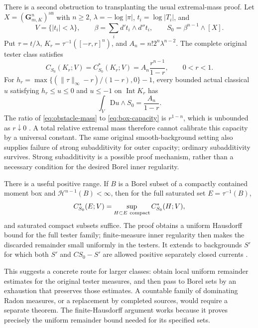 \documentclass[11pt,a4paper]{article}
\newcommand{\MathEqref}[1]{{\hypersetup{linkcolor=EquationLink}\eqref{#1}}}
\theoremstyle{definition}
\theoremstyle{remark}
\numberwithin{equation}{section}
\newcommand{\an}{\mathrm{an}}
\newcommand{\D}{\mathrm D}
\begin{document}
There is a second obstruction to transplanting the usual extremal-mass
proof.  Let $X=(\mathbf G_{m,K}^n)^{\an}$ with $n\ge2$,
$\lambda=-\log|\pi|$, $t_i=\log|T_i|$, and
\[
 V=\{|t_i|<\lambda\},\qquad
 \beta=\sum_i d't_i\wedge d''t_i,\qquad S_0=\beta^{n-1}\wedge[X].
\]
Put $\tau=t/\lambda$, $K_r=\tau^{-1}([-r,r]^n)$, and
$A_n=n!2^n\lambda^{n-2}$.  The complete original tester class satisfies
\begin{equation}
                 C_{S_0}(K_r;V)=C_{S_0}^*(K_r;V)
                       =A_n\frac{r^{n-1}}{1-r},\qquad 0<r<1.
                         \label{eq:box-capacity}
\end{equation}
For
$h_r=\max\{(\|\tau\|_\infty-r)/(1-r),0\}-1$,
every bounded actual classical $u$ satisfying
$h_r\le u\le0$ and $u\le-1$ on $\operatorname{Int}K_r$ has
\begin{equation}
                  \int_V\D u\wedge S_0=\frac{A_n}{1-r}.
                         \label{eq:obstacle-mass}
\end{equation}
The ratio of \MathEqref{eq:obstacle-mass} to
\MathEqref{eq:box-capacity} is $r^{1-n}$, which is unbounded as
$r\downarrow0$ \cite{Capacity}.  A total relative extremal mass
therefore cannot calibrate this capacity by a universal constant.
The same original smooth-background setting also supplies failure of
strong subadditivity for outer capacity; ordinary subadditivity
survives.  Strong subadditivity is a possible proof mechanism, rather
than a necessary condition for the desired Borel inner regularity.

There is a useful positive range.  If $B$ is a Borel subset of a
compactly contained moment box and
$\mathcal H^{n-1}(B)<\infty$, then for the full saturated set
$E=\tau^{-1}(B)$,
\begin{equation}
 C_{S_0}^*(E;V)=
       \sup_{H\subset E\ {\rm compact}}C_{S_0}^*(H;V),
                         \label{eq:hausdorff-range}
\end{equation}
and saturated compact subsets suffice.  The proof obtains a uniform
Hausdorff bound for the full tester family; finite-measure inner
regularity then makes the discarded remainder small uniformly in
the testers.  It extends to backgrounds $S'$ for which both $S'$ and
$CS_0-S'$ are allowed positive separately closed currents
\cite{Capacity}.

This suggests a concrete route for larger classes: obtain local
uniform remainder estimates for the original tester measures, and
then pass to Borel sets by an exhaustion that preserves those
estimates.  A countable family of dominating Radon measures, or a
replacement by completed sources, would require a separate theorem.
The finite-Hausdorff argument works because it proves precisely the
uniform remainder bound needed for its specified sets.
\end{document}
